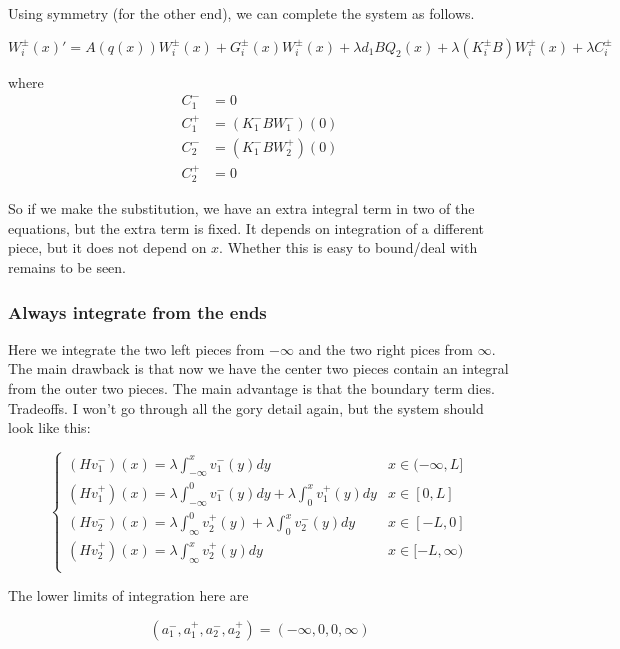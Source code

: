 \documentclass[12pt]{article}
\begin{document}
Using symmetry (for the other end), we can complete the system as follows.

\begin{equation}
W_i^\pm(x)' = A(q(x)) W_i^\pm(x) + G_i^\pm(x) W_i^\pm(x) + \lambda d_1 B Q_2(x) + \lambda (K_i^\pm B )W_i^\pm(x) + \lambda C_i^\pm
\end{equation}

where 
\begin{align*}
C_1^- &= 0 \\
C_1^+ &= (K_1^- B W_1^-)(0) \\
C_2^- &= (K_1^- B W_2^+)(0) \\
C_2^+ &= 0
\end{align*}

So if we make the substitution, we have an extra integral term in two of the equations, but the extra term is fixed. It depends on integration of a different piece, but it does not depend on $x$. Whether this is easy to bound/deal with remains to be seen.

\subsubsection*{Always integrate from the ends}

Here we integrate the two left pieces from $-\infty$ and the two right pices from $\infty$. The main drawback is that now we have the center two pieces contain an integral from the outer two pieces. The main advantage is that the boundary term dies. Tradeoffs. I won't go through all the gory detail again, but the system should look like this:

\begin{equation}
\begin{cases}
(Hv_1^-)(x) = \lambda \int_{-\infty}^x v_1^-(y) dy & x \in (-\infty, L] \\
(Hv_1^+)(x) = \lambda \int_{-\infty}^0 v_1^-(y) dy + \lambda \int_{0}^x v_1^+(y) dy & x \in [0, L] \\
(Hv_2^-)(x) = \lambda \int_{\infty}^0 v_2^+(y) + \lambda \int_{0}^x v_2^-(y) dy & x \in [-L, 0] \\ 
(Hv_2^+)(x) = \lambda \int_{\infty}^x v_2^+(y) dy & x \in [-L, \infty) \\ 
\end{cases}
\end{equation}

The lower limits of integration here are 

\[
(a_1^-, a_1^+, a_2^-, a_2^+) = (-\infty, 0, 0, \infty)
\]
\end{document}
